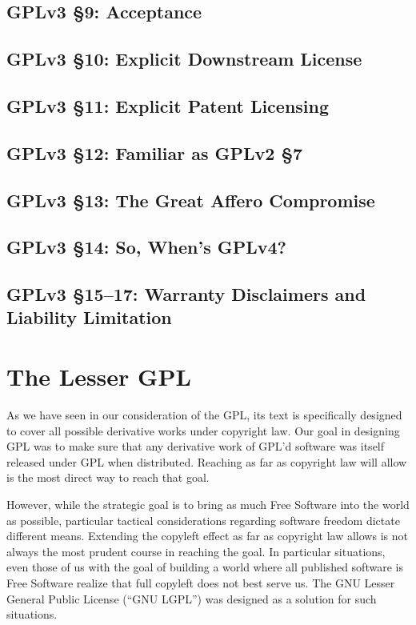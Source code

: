 \section{GPLv3 \S 9: Acceptance}

\section{GPLv3 \S 10: Explicit Downstream License}

\section{GPLv3 \S 11: Explicit Patent Licensing}
\label{GPLv3s11}
\section{GPLv3 \S 12: Familiar as GPLv2 \S 7}

\section{GPLv3 \S 13: The Great Affero Compromise}

\section{GPLv3 \S 14: So, When's GPLv4?}

\section{GPLv3 \S 15--17: Warranty Disclaimers and Liability Limitation}


\chapter{The Lesser GPL}

As we have seen in our consideration of the GPL, its text is specifically
designed to cover all possible derivative works under copyright law. Our
goal in designing GPL was to make sure that any derivative work of GPL'd
software was itself released under GPL when distributed. Reaching as far
as copyright law will allow is the most direct way to reach that goal.

However, while the strategic goal is to bring as much Free Software
into the world as possible, particular tactical considerations
regarding software freedom dictate different means. Extending the
copyleft effect as far as copyright law allows is not always the most
prudent course in reaching the goal. In particular situations, even
those of us with the goal of building a world where all published
software is Free Software realize that full copyleft does not best
serve us. The GNU Lesser General Public License (``GNU LGPL'') was
designed as a solution for such situations.

